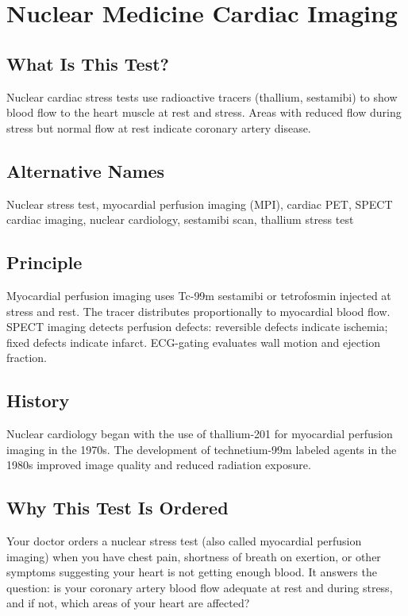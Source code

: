 \chapter{Nuclear Medicine Cardiac Imaging}

\section*{What Is This Test?}
Nuclear cardiac stress tests use radioactive tracers (thallium, sestamibi) to show blood flow to the heart muscle at rest and stress. Areas with reduced flow during stress but normal flow at rest indicate coronary artery disease.

\section*{Alternative Names}
Nuclear stress test, myocardial perfusion imaging (MPI), cardiac PET, SPECT cardiac imaging, nuclear cardiology, sestamibi scan, thallium stress test


\section*{Principle}
Myocardial perfusion imaging uses Tc-99m sestamibi or tetrofosmin injected at stress and rest. The tracer distributes proportionally to myocardial blood flow. SPECT imaging detects perfusion defects: reversible defects indicate ischemia; fixed defects indicate infarct. ECG-gating evaluates wall motion and ejection fraction.

\section*{History}
Nuclear cardiology began with the use of thallium-201 for myocardial perfusion imaging in the 1970s. The development of technetium-99m labeled agents in the 1980s improved image quality and reduced radiation exposure.

\section*{Why This Test Is Ordered}
Your doctor orders a nuclear stress test (also called myocardial perfusion imaging) when you have chest pain, shortness of breath on exertion, or other symptoms suggesting your heart is not getting enough blood. It answers the question: is your coronary artery blood flow adequate at rest and during stress, and if not, which areas of your heart are affected?

